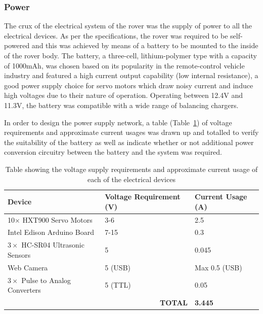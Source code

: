     \subsubsection{Power}
      The crux of the electrical system of the rover was the supply of power to all the electrical devices. As per the specifications, the rover was required to be self-powered and this was achieved by means of a battery to be mounted to the inside of the rover body. The battery, a three-cell, lithium-polymer type with a capacity of 1000mAh, was chosen based on its popularity in the remote-control vehicle industry and featured a high current output capability (low internal resistance), a good power supply choice for servo motors which draw noisy current and induce high voltages due to their nature of operation. Operating between 12.4V and 11.3V, the battery was compatible with a wide range of balancing chargers.
      
      In order to design the power supply network, a table (Table~\ref{tab:elecDesign-powerRequirements}) of voltage requirements and approximate current usages was drawn up and totalled to verify the suitability of the battery as well as indicate whether or not additional power conversion circuitry between the battery and the system was required.
      
      \begin{table}[h!]
      \centering
      \begin{tabular}{@{}lll@{}}
      \toprule
      Device                               & Voltage Requirement (V) & Current Usage (A) \\ \midrule
      10$\times$ HXT900 Servo Motors       & 3-6                     & 2.5               \\
      Intel Edison Arduino Board           & 7-15                    & 0.3               \\
      $3\times$ HC-SR04 Ultrasonic Sensors & 5                       & 0.045             \\
      Web Camera                           & 5 (USB)                 & Max 0.5 (USB)     \\
      $3\times$ Pulse to Analog Converters & 5 (TTL)                 & 0.05               \\ \midrule
      \multicolumn{2}{r}{\textbf{TOTAL}}                             & \textbf{3.445}    \\ \bottomrule
      \end{tabular}
      \caption{Table showing the voltage supply requirements and approximate current usage of each of the electrical devices}
      \label{tab:elecDesign-powerRequirements}
      \end{table}
      
